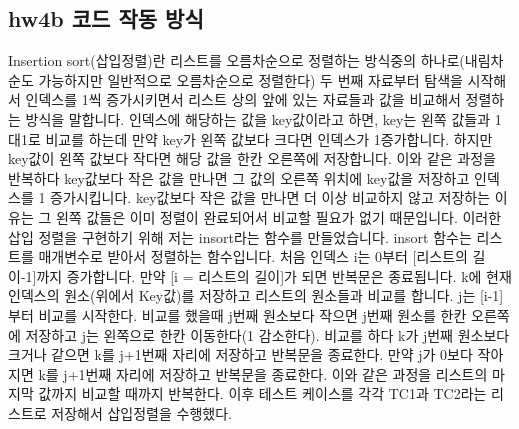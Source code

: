 \documentclass{article}
\begin{document}
\subsection{hw4b 코드 작동 방식}
Insertion sort(삽입정렬)란 리스트를 오름차순으로 정렬하는 방식중의 하나로(내림차순도 가능하지만 일반적으로 오름차순으로 정렬한다) 두 번째 자료부터 탐색을 시작해서 인덱스를 1씩 증가시키면서 리스트 상의 앞에 있는 자료들과 값을 비교해서 정렬하는 방식을 말합니다. 인덱스에 해당하는 값을 key값이라고 하면, key는 왼쪽 값들과 1대1로 비교를 하는데 만약 key가 왼쪽 값보다 크다면 인덱스가 1증가합니다. 하지만 key값이 왼쪽 값보다 작다면 해당 값을 한칸 오른쪽에 저장합니다. 이와 같은 과정을 반복하다 key값보다 작은 값을 만나면 그 값의 오른쪽 위치에 key값을 저장하고 인덱스를 1 증가시킵니다. key값보다 작은 값을 만나면 더 이상 비교하지 않고 저장하는 이유는 그 왼쪽 값들은 이미 정렬이 완료되어서 비교할 필요가 없기 때문입니다. 이러한 삽입 정렬을 구현하기 위해 저는 insort라는 함수를 만들었습니다. insort 함수는 리스트를 매개변수로 받아서 정렬하는 함수입니다. 처음 인덱스 i는 0부터 [리스트의 길이-1]까지 증가합니다. 만약 [i = 리스트의 길이]가 되면 반복문은 종료됩니다. k에 현재 인덱스의 원소(위에서 Key값)를 저장하고 리스트의 원소들과 비교를 합니다. j는 [i-1]부터 비교를 시작한다. 비교를 했을때 j번째 원소보다 작으면 j번째 원소를 한칸 오른쪽에 저장하고 j는 왼쪽으로 한칸 이동한다(1 감소한다). 비교를 하다 k가 j번째 원소보다 크거나 같으면 k를 j+1번째 자리에 저장하고 반복문을 종료한다. 만약 j가 0보다 작아지면 k를 j+1번째 자리에 저장하고 반복문을 종료한다. 이와 같은 과정을 리스트의 마지막 값까지 비교할 때까지 반복한다.
이후 테스트 케이스를 각각 TC1과 TC2라는 리스트로 저장해서 삽입정렬을 수행했다.
\end{document}
